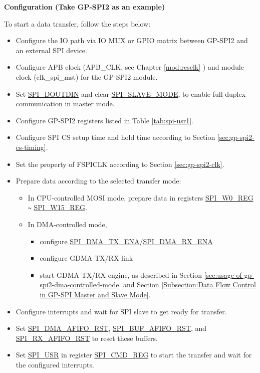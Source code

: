 \documentclass[main\_\_EN.tex]{subfiles}
\begin{document}
\textbf{Configuration (Take GP-SPI2 as an example)}

To start a data transfer, follow the steps below:
\begin{itemize}
    \item Configure the IO path via IO MUX or GPIO matrix between GP-SPI2 and an external SPI device.
    \item Configure APB clock (APB\_CLK, see Chapter \ref{mod:resclk} \textit{}) and module clock (clk\_spi\_mst) for the GP-SPI2 module.
    \item Set \hyperref[fielddesc:SPIDOUTDIN]{SPI\_DOUTDIN} and clear \hyperref[fielddesc:SPISLAVEMODE]{SPI\_SLAVE\_MODE}, to enable full-duplex communication in master mode.

    \item Configure GP-SPI2 registers listed in Table \ref{tab:spi-usr1}.

    \item Configure SPI CS setup time and hold time according to Section \ref{sec:gp-spi2-cs-timing}.

    \item Set the property of FSPICLK according to Section \ref{sec:gp-spi2-clk}.

    \item Prepare data according to the selected transfer mode:
    \begin{itemize}
        \item In CPU-controlled MOSI mode, prepare data in registers \hyperref[regdesc:SPIW0REG]{SPI\_W0\_REG} \verb+~+ \hyperref[regdesc:SPIW15REG]{SPI\_W15\_REG}.

        \item In DMA-controlled mode,
        \begin{itemize}
            \item configure \hyperref[fielddesc:SPIDMATXENA]{SPI\_DMA\_TX\_ENA}/\hyperref[fielddesc:SPIDMARXENA]{SPI\_DMA\_RX\_ENA}
            \item configure GDMA TX/RX link
            \item start GDMA TX/RX engine, as described in Section \ref{sec:usage-of-gp-spi2-dma-controlled-mode} and Section \ref{Subsection:Data Flow Control in GP-SPI Master and Slave Mode}.
        \end{itemize}
    \end{itemize}

    \item Configure interrupts \label{step:master-interrupt-fd} and wait for SPI slave to get ready for transfer.

    \item Set \hyperref[fielddesc:SPIDMAAFIFORST]{SPI\_DMA\_AFIFO\_RST}, \hyperref[fielddesc:SPIBUFAFIFORST]{SPI\_BUF\_AFIFO\_RST}, and \hyperref[fielddesc:SPIRXAFIFORST]{SPI\_RX\_AFIFO\_RST} to reset these buffers.

    \item Set \hyperref[fielddesc:SPIUSR]{SPI\_USR} in register \hyperref[regdesc:SPICMDREG]{SPI\_CMD\_REG} to start the transfer and wait for the configured interrupts.

\end{itemize}
\end{document}
